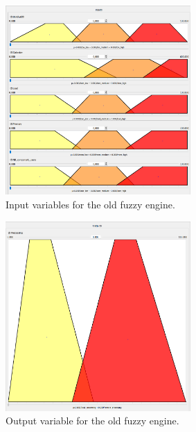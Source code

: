 \begin{figure}[H]
  \centering
  \includegraphics[width=0.63\textwidth]{../images/old-vars-inputs.png}
  \caption{Input variables for the old fuzzy engine.}
  \label{fig:old-fuzzy-engine-inputs}
\end{figure}

\begin{figure}[H]
  \centering
  \includegraphics[width=0.63\textwidth]{../images/old-vars-output.png}
  \caption{Output variable for the old fuzzy engine.}
  \label{fig:old-fuzzy-engine-output}
\end{figure}

